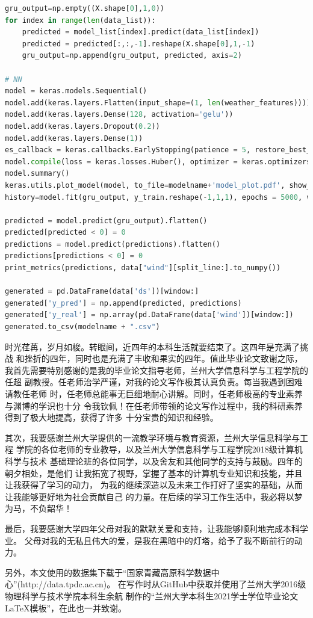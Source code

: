 \documentclass[AutoFakeBold]{LZUThesis}
\begin{document}
\begin{lstlisting}[language = python]
gru_output=np.empty((X.shape[0],1,0))
for index in range(len(data_list)):
    predicted = model_list[index].predict(data_list[index])
    predicted = predicted[:,:,-1].reshape(X.shape[0],1,-1)
    gru_output=np.append(gru_output, predicted, axis=2)

# NN
model = keras.models.Sequential()
model.add(keras.layers.Flatten(input_shape=(1, len(weather_features))))
model.add(keras.layers.Dense(128, activation='gelu'))
model.add(keras.layers.Dropout(0.2))
model.add(keras.layers.Dense(1))
es_callback = keras.callbacks.EarlyStopping(patience = 5, restore_best_weights = True, monitor="loss")
model.compile(loss = keras.losses.Huber(), optimizer = keras.optimizers.Nadam(0.001))
model.summary()
keras.utils.plot_model(model, to_file=modelname+'model_plot.pdf', show_shapes=True, show_layer_names=True)
history=model.fit(gru_output, y_train.reshape(-1,1,1), epochs = 5000, verbose = 1, shuffle = True, callbacks = [es_callback])

predicted = model.predict(gru_output).flatten()
predicted[predicted < 0] = 0
predictions = model.predict(predictions).flatten()
predictions[predictions < 0] = 0
print_metrics(predictions, data["wind"][split_line:].to_numpy())

generated = pd.DataFrame(data['ds'])[window:]
generated['y_pred'] = np.append(predicted, predictions)
generated['y_real'] = np.array(pd.DataFrame(data['wind'])[window:])
generated.to_csv(modelname + ".csv")
\end{lstlisting}

\Thanks

时光荏苒，岁月如梭。转眼间，近四年的本科生活就要结束了。这四年是充满了挑战
和挫折的四年，同时也是充满了丰收和果实的四年。值此毕业论文致谢之际，
我首先需要特别感谢的是我的毕业论文指导老师，兰州大学信息科学与工程学院的任超
副教授。任老师治学严谨，对我的论文写作极其认真负责。每当我遇到困难请教任老师
时，任老师总能事无巨细地耐心讲解。同时，任老师极高的专业素养与渊博的学识也十分
令我钦佩！在任老师带领的论文写作过程中，我的科研素养得到了极大地提高，获得了许多
十分宝贵的知识和经验。

其次，我要感谢兰州大学提供的一流教学环境与教育资源，兰州大学信息科学与工程
学院的各位老师的专业教导，以及兰州大学信息科学与工程学院2018级计算机科学与技术
基础理论班的各位同学，以及舍友和其他同学的支持与鼓励。四年的朝夕相处，是他们
让我拓宽了视野，掌握了基本的计算机专业知识和技能，并且让我获得了学习的动力，
为我的继续深造以及未来工作打好了坚实的基础，从而让我能够更好地为社会贡献自己
的力量。在后续的学习工作生活中，我必将以梦为马，不负韶华！

最后，我要感谢大学四年父母对我的默默关爱和支持，让我能够顺利地完成本科学业。
父母对我的无私且伟大的爱，是我在黑暗中的灯塔，给予了我不断前行的动力。

另外，本文使用的数据集下载于“国家青藏高原科学数据中心”(http://data.tpdc.ac.cn)。
在写作时从GitHub中获取并使用了兰州大学2016级物理科学与技术学院本科生余航
制作的“兰州大学本科生2021学士学位毕业论文LaTeX模板”，在此也一并致谢。

\rightline{}

\end{document}
